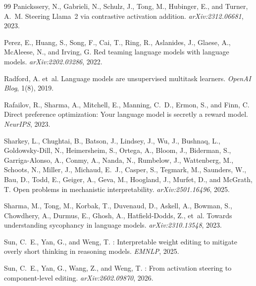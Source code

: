 \documentclass{article}
\begin{document}
\begin{thebibliography}{99}
Panickssery, N., Gabrieli, N., Schulz, J., Tong, M., Hubinger, E., and
 Turner, A.~M.
\newblock Steering {Llama~2} via contrastive activation addition.
\newblock \emph{arXiv:2312.06681}, 2023.

Perez, E., Huang, S., Song, F., Cai, T., Ring, R., Aslanides, J.,
 Glaese, A., McAleese, N., and Irving, G.
\newblock Red teaming language models with language models.
\newblock \emph{arXiv:2202.03286}, 2022.

Radford, A. et~al.
\newblock Language models are unsupervised multitask learners.
\newblock \emph{OpenAI Blog}, 1(8), 2019.

Rafailov, R., Sharma, A., Mitchell, E., Manning, C.~D., Ermon, S., and
 Finn, C.
\newblock Direct preference optimization: Your language model is
 secretly a reward model.
\newblock \emph{NeurIPS}, 2023.

Sharkey, L., Chughtai, B., Batson, J., Lindsey, J., Wu, J.,
 Bushnaq, L., Goldowsky-Dill, N., Heimersheim, S., Ortega, A.,
 Bloom, J., Biderman, S., Garriga-Alonso, A., Conmy, A., Nanda, N.,
 Rumbelow, J., Wattenberg, M., Schoots, N., Miller, J.,
 Michaud, E.~J., Casper, S., Tegmark, M., Saunders, W., Bau, D.,
 Todd, E., Geiger, A., Geva, M., Hoogland, J., Murfet, D.,
 and McGrath, T.
\newblock Open problems in mechanistic interpretability.
\newblock \emph{arXiv:2501.16496}, 2025.

Sharma, M., Tong, M., Korbak, T., Duvenaud, D., Askell, A., Bowman, S.,
 Chowdhery, A., Durmus, E., Ghosh, A., Hatfield-Dodds, Z., et~al.
\newblock Towards understanding sycophancy in language models.
\newblock \emph{arXiv:2310.13548}, 2023.

Sun, C.~E., Yan, G., and Weng, T.
: Interpretable weight editing to mitigate overly
 short thinking in reasoning models.
\newblock \emph{EMNLP}, 2025.

Sun, C.~E., Yan, G., Wang, Z., and Weng, T.
: From activation steering to component-level
 editing.
\newblock \emph{arXiv:2602.09870}, 2026.


\end{thebibliography}
\end{document}
